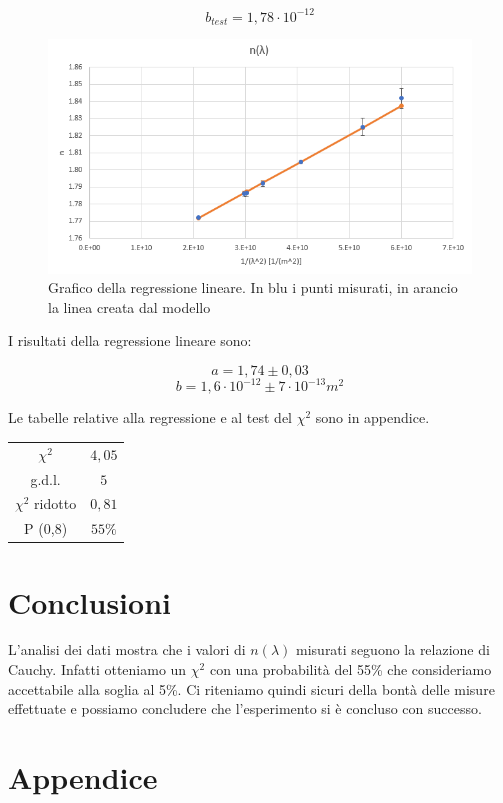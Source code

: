\documentclass{article}
\begin{document}
\[b_{test}=1,78 \cdot 10^{-12}\]

\begin{figure}[h!]
  \centering
  \includegraphics[width=0.9\linewidth]{GraficoPrisma2}
  \caption{Grafico della regressione lineare. In blu i punti misurati, in arancio la linea creata dal modello}
\end{figure}

I risultati della regressione lineare sono:

\[a=1,74 \pm 0,03\]
\[b=1,6 \cdot 10^{-12} \pm 7 \cdot 10^{-13} m^2\]

Le tabelle relative alla regressione e al test del $\chi ^2$ sono in appendice.

\begin{center}
\begin{tabular}{ | c | c |  }
  \hline
  $\chi ^2$ & $4,05$\\
  g.d.l. & $5$\\
  $\chi ^2$ ridotto & $0,81$\\
  \hline
  P (0,8) & $55 \%$\\
  \hline
\end{tabular}
\end{center}

\section{Conclusioni}
L'analisi dei dati mostra che i valori di $n(\lambda)$ misurati seguono la relazione di Cauchy. Infatti otteniamo un $\chi^2$ con una probabilità del 55\% che consideriamo accettabile alla soglia al 5\%. Ci riteniamo quindi sicuri della bontà delle misure effettuate e possiamo concludere che l'esperimento si è concluso con successo.

\clearpage

\section{Appendice}
\end{document}

